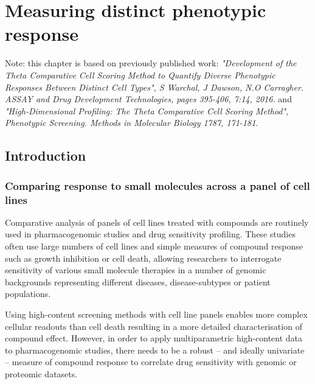 \documentclass[a4paper,11pt,twoside,openright]{scrbook}
\begin{document}



\chapter{Measuring distinct phenotypic response} \label{chapter:tccs}

\scriptsize{Note: this chapter is based on previously published work: \textit{"Development of the Theta Comparative Cell Scoring Method to Quantify Diverse Phenotypic Responses Between Distinct Cell Types", S Warchal, J Dawson, N.O Carragher. ASSAY and Drug Development Technologies, pages 395-406, 7:14, 2016.} and \textit{"High-Dimensional Profiling: The Theta Comparative Cell Scoring Method", Phenotypic Screening. Methods in Molecular Biology 1787, 171-181}.} 



\section{Introduction}
\normalsize
\subsection{Comparing response to small molecules across a panel of cell lines}
Comparative analysis of panels of cell lines treated with compounds are routinely used in pharmacogenomic studies and drug sensitivity profiling.
These studies often use large numbers of cell lines and simple measures of compound response such as growth inhibition or cell death, allowing researchers to interrogate sensitivity of various small molecule therapies in a number of genomic backgrounds representing different diseases, disease-subtypes or patient populations.

Using high-content screening methods with cell line panels enables more complex cellular readouts than cell death resulting in a more detailed characterisation of compound effect.
However, in order to apply multiparametric high-content data to pharmacogenomic studies, there needs to be a robust -- and ideally univariate -- measure of compound response to correlate drug sensitivity with genomic or proteomic datasets.
\end{document}
